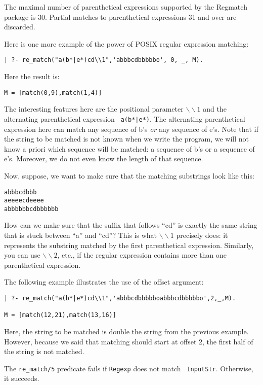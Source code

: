 The maximal number of parenthetical expressions supported by the Regmatch
package is 30. Partial matches to parenthetical expressions 31 and over are
discarded.

Here is one more example of the power of POSIX regular expression matching:
\begin{verbatim}
| ?- re_match("a(b*|e*)cd\\1",'abbbcdbbbbbo', 0, _, M).  
\end{verbatim}
Here the result is:
\begin{verbatim}
M = [match(0,9),match(1,4)]
\end{verbatim}
The interesting features here are the positional parameter
$\backslash\backslash 1$ and the alternating parenthetical expression {\tt
a(b*|e*)}. The alternating parenthetical expression here can match any
sequence of b's \emph{or} any sequence of e's. Note that if the string to
be matched is not known when we write the program, we will not know a
priori which sequence will be matched: a sequence of b's or a sequence of e's.
Moreover, we do not even know the length of that sequence.

Now, suppose, we want to make sure that the matching substrings look like this:
\begin{verbatim}
abbbcdbbb
aeeeecdeeee
abbbbbbcdbbbbbb
\end{verbatim}
How can we make sure that the suffix that follows ``cd'' is exactly the same
string that is stuck between ``a'' and ``cd''? This is what
$\backslash\backslash 1$ precisely does: it represents the substring
matched by the first parenthetical expression. Similarly, you can use
$\backslash\backslash 2$, etc., if the regular expression contains more
than one parenthetical expression.

The following example illustrates the use of the offset argument:
\begin{verbatim}
| ?- re_match("a(b*|e*)cd\\1",'abbbcdbbbbboabbbcdbbbbbo',2,_,M).  

M = [match(12,21),match(13,16)]  
\end{verbatim}
Here, the string to be matched is double the string from the previous
example. However, because we said that matching should start at offset 2,
the first half of the string is not matched.

The \verb|re_match/5| predicate fails if {\tt Regexp} does not match {\tt
  InputStr}.  Otherwise, it succeeds.


